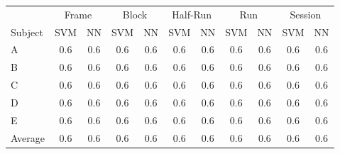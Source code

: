 \begin{tabular}{l *{10}{c}}
\toprule
& \multicolumn{2}{c}{Frame} & \multicolumn{2}{c}{Block} & \multicolumn{2}{c}{Half-Run} & \multicolumn{2}{c}{Run} & \multicolumn{2}{c}{Session} \\
\cmidrule(lr){2-3} \cmidrule(rl){4-5} \cmidrule(rl){6-7} \cmidrule(rl){8-9} \cmidrule(l){10-11}
Subject	& SVM & NN & SVM & NN & SVM & NN & SVM & NN & SVM & NN \\
\midrule
A		& 0.6 & 0.6 & 0.6 & 0.6 & 0.6 & 0.6 & 0.6 & 0.6 & 0.6 & 0.6 \\
B		& 0.6 & 0.6 & 0.6 & 0.6 & 0.6 & 0.6 & 0.6 & 0.6 & 0.6 & 0.6 \\
C		& 0.6 & 0.6 & 0.6 & 0.6 & 0.6 & 0.6 & 0.6 & 0.6 & 0.6 & 0.6 \\
D		& 0.6 & 0.6 & 0.6 & 0.6 & 0.6 & 0.6 & 0.6 & 0.6 & 0.6 & 0.6 \\
E		& 0.6 & 0.6 & 0.6 & 0.6 & 0.6 & 0.6 & 0.6 & 0.6 & 0.6 & 0.6 \\
Average	& 0.6 & 0.6 & 0.6 & 0.6 & 0.6 & 0.6 & 0.6 & 0.6 & 0.6 & 0.6 \\
\bottomrule 
\end{tabular}
